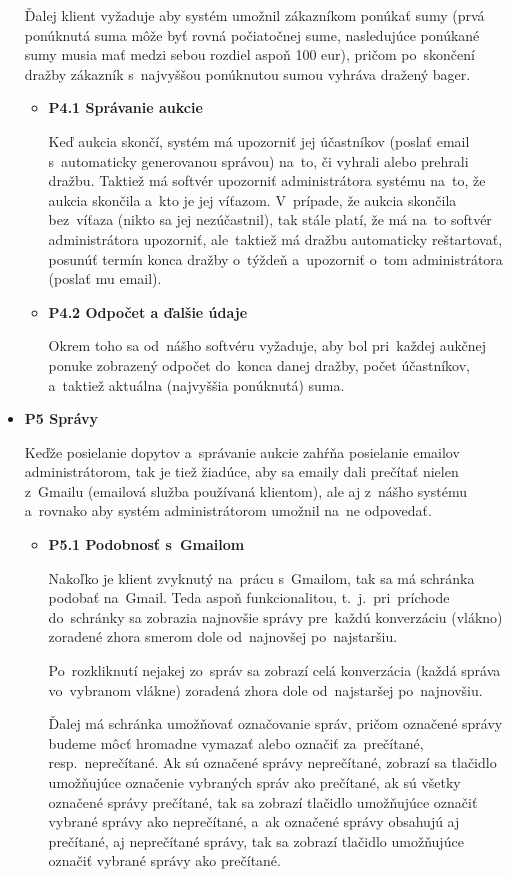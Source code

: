 \begin{itemize}
Ďalej klient vyžaduje aby systém umožnil zákazníkom ponúkať sumy (prvá ponúknutá suma môže byť rovná počiatočnej sume, nasledujúce ponúkané sumy musia mať medzi sebou rozdiel aspoň 100 eur), pričom po~skončení dražby zákazník s~najvyššou ponúknutou sumou vyhráva dražený bager.

\begin{itemize}
\item \textbf{P4.1 Správanie aukcie}

Keď aukcia skončí, systém má upozorniť jej účastníkov (poslať email s~automaticky generovanou správou) na~to, či vyhrali alebo prehrali dražbu. Taktiež má softvér upozorniť administrátora systému na~to, že aukcia skončila a~kto je jej víťazom. V~prípade, že aukcia skončila bez~víťaza (nikto sa jej nezúčastnil), tak stále platí, že má na~to softvér administrátora upozorniť, ale~taktiež má dražbu automaticky reštartovať, posunúť termín konca dražby o~týždeň a~upozorniť o~tom administrátora (poslať mu email).

\item \textbf{P4.2 Odpočet a ďalšie údaje}

Okrem toho sa od~nášho softvéru vyžaduje, aby bol pri~každej aukčnej ponuke zobrazený odpočet do~konca danej dražby, počet účastníkov, a~taktiež aktuálna (najvyššia ponúknutá) suma.
\end{itemize}

\item \textbf{P5 Správy}

Keďže posielanie dopytov a~správanie aukcie zahŕňa posielanie emailov administrátorom, tak je tiež žiadúce, aby sa emaily dali prečítať nielen z~Gmailu (emailová služba používaná klientom), ale aj z~nášho systému a~rovnako aby systém administrátorom umožnil na~ne odpovedať.

\begin{itemize}
\item \textbf{P5.1 Podobnosť s~Gmailom}

Nakoľko je klient zvyknutý na~prácu s~Gmailom, tak sa má schránka podobať na~Gmail. Teda aspoň funkcionalitou, t.~j.~pri~príchode do~schránky sa zobrazia najnovšie správy pre~každú konverzáciu (vlákno) zoradené zhora smerom dole od~najnovšej po~najstaršiu.

Po~rozkliknutí nejakej zo~správ sa zobrazí celá konverzácia (každá správa vo~vybranom vlákne) zoradená zhora dole od~najstaršej po~najnovšiu.

Ďalej má schránka umožňovať označovanie správ, pričom označené správy budeme môcť hromadne vymazať alebo označiť za~prečítané, resp.~neprečítané. Ak sú označené správy neprečítané, zobrazí sa tlačidlo umožňujúce označenie vybraných správ ako prečítané, ak sú všetky označené správy prečítané, tak sa zobrazí tlačidlo umožňujúce označiť vybrané správy ako neprečítané, a~ak označené správy obsahujú aj prečítané, aj neprečítané správy, tak sa zobrazí tlačidlo umožňujúce označiť vybrané správy ako prečítané.


\end{itemize}
\end{itemize}
